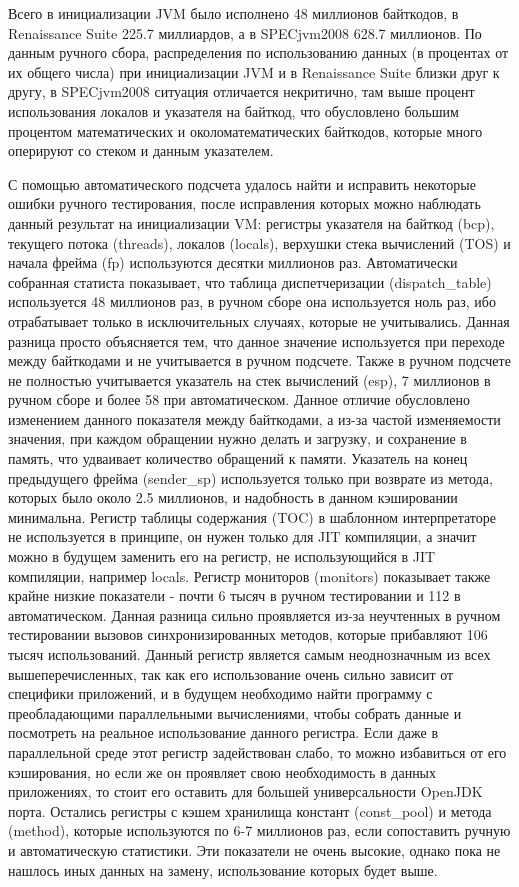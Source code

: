 Всего в инициализации JVM было исполнено 48 миллионов байткодов, в Renaissance Suite 225.7 миллиардов, а в SPECjvm2008 628.7 миллионов. По данным ручного сбора, распределения по использованию данных (в процентах от их общего числа) при инициализации JVM и в Renaissance Suite близки друг к другу, в SPECjvm2008 ситуация отличается некритично, там выше процент использования локалов и указателя на байткод, что обусловлено большим процентом математических и околоматематических байткодов, которые много оперируют со стеком и данным указателем.

С помощью автоматического подсчета удалось найти и исправить некоторые ошибки ручного тестирования, после исправления которых можно наблюдать данный результат на инициализации VM: регистры указателя на байткод (bcp), текущего потока (threads), локалов (locals), верхушки стека вычислений (TOS) и начала фрейма (fp) используются десятки миллионов раз. Автоматически собранная статиста показывает, что таблица диспетчеризации (dispatch\_table) используется 48 миллионов раз, в ручном сборе она используется ноль раз, ибо отрабатывает только в исключительных случаях, которые не учитывались. Данная разница просто объясняется тем, что данное значение используется при переходе между байткодами и не учитывается в ручном подсчете. Также в ручном подсчете не полностью учитывается указатель на стек вычислений (esp), 7 миллионов в ручном сборе и более 58 при автоматическом. Данное отличие обусловлено изменением данного показателя между байткодами, а из-за частой изменяемости значения, при каждом обращении нужно делать и загрузку, и сохранение в память, что удваивает количество обращений к памяти. Указатель на конец предыдущего фрейма (sender\_sp) используется только при возврате из метода, которых было около 2.5 миллионов, и надобность в данном кэшировании минимальна. Регистр таблицы содержания (TOC) в шаблонном интерпретаторе не используется в принципе, он нужен только для JIT компиляции, а значит можно в будущем заменить его на регистр, не использующийся в JIT компиляции, например locals. Регистр мониторов (monitors) показывает также крайне низкие показатели - почти 6 тысяч в ручном тестировании и 112 в автоматическом. Данная разница сильно проявляется из-за неучтенных в ручном тестировании вызовов синхронизированных методов, которые прибавляют 106 тысяч использований. Данный регистр является самым неоднозначным из всех вышеперечисленных, так как его использование очень сильно зависит от специфики приложений, и в будущем необходимо найти программу с преобладающими параллельными вычислениями, чтобы собрать данные и посмотреть на реальное использование данного регистра. Если даже в параллельной среде этот регистр задействован слабо, то можно избавиться от его кэширования, но если же он проявляет свою необходимость в данных приложениях, то стоит его оставить для большей универсальности OpenJDK порта. Остались регистры с кэшем хранилища констант (const\_pool) и метода (method), которые используются по 6-7 миллионов раз, если сопоставить ручную и автоматическую статистики. Эти показатели не очень высокие, однако пока не нашлось иных данных на замену, использование которых будет выше.

